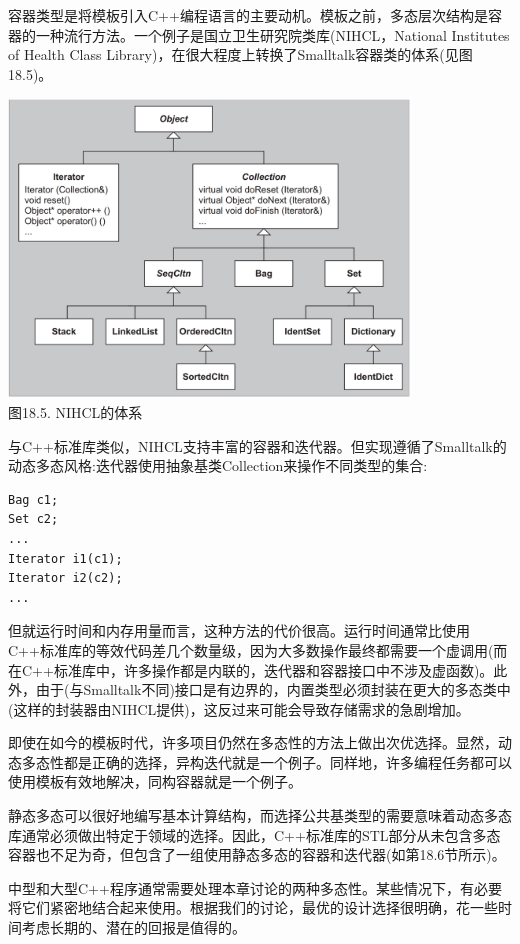 容器类型是将模板引入C++编程语言的主要动机。模板之前，多态层次结构是容器的一种流行方法。一个例子是国立卫生研究院类库(NIHCL，National Institutes of Health Class Library)，在很大程度上转换了Smalltalk容器类的体系(见图18.5)。

\begin{center}
\includegraphics[width=0.8\textwidth]{content/3/chapter18/images/5.png} \\
图18.5. NIHCL的体系
\end{center}

与C++标准库类似，NIHCL支持丰富的容器和迭代器。但实现遵循了Smalltalk的动态多态风格:迭代器使用抽象基类Collection来操作不同类型的集合:

\begin{lstlisting}[style=styleCXX]
Bag c1;
Set c2;
...
Iterator i1(c1);
Iterator i2(c2);
...
\end{lstlisting}

但就运行时间和内存用量而言，这种方法的代价很高。运行时间通常比使用C++标准库的等效代码差几个数量级，因为大多数操作最终都需要一个虚调用(而在C++标准库中，许多操作都是内联的，迭代器和容器接口中不涉及虚函数)。此外，由于(与Smalltalk不同)接口是有边界的，内置类型必须封装在更大的多态类中(这样的封装器由NIHCL提供)，这反过来可能会导致存储需求的急剧增加。

即使在如今的模板时代，许多项目仍然在多态性的方法上做出次优选择。显然，动态多态性都是正确的选择，异构迭代就是一个例子。同样地，许多编程任务都可以使用模板有效地解决，同构容器就是一个例子。

静态多态可以很好地编写基本计算结构，而选择公共基类型的需要意味着动态多态库通常必须做出特定于领域的选择。因此，C++标准库的STL部分从未包含多态容器也不足为奇，但包含了一组使用静态多态的容器和迭代器(如第18.6节所示)。

中型和大型C++程序通常需要处理本章讨论的两种多态性。某些情况下，有必要将它们紧密地结合起来使用。根据我们的讨论，最优的设计选择很明确，花一些时间考虑长期的、潜在的回报是值得的。





















